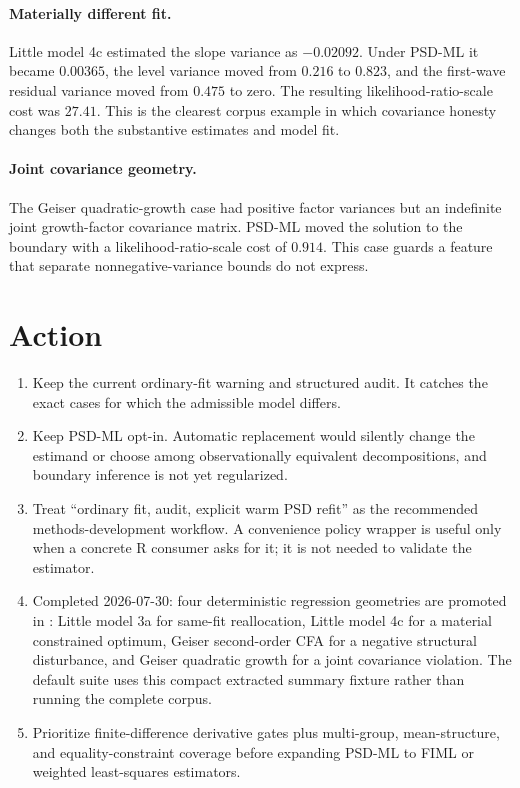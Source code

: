 \documentclass[11pt]{article}
\begin{document}
\paragraph{Materially different fit.}
Little model 4c estimated the slope variance as \(-0.02092\).  Under PSD-ML it
became \(0.00365\), the level variance moved from \(0.216\) to \(0.823\), and
the first-wave residual variance moved from \(0.475\) to zero.  The resulting
likelihood-ratio-scale cost was \(27.41\).  This is the clearest corpus example
in which covariance honesty changes both the substantive estimates and model
fit.

\paragraph{Joint covariance geometry.}
The Geiser quadratic-growth case had positive factor variances but an
indefinite joint growth-factor covariance matrix.  PSD-ML moved the solution
to the boundary with a likelihood-ratio-scale cost of \(0.914\).  This case
guards a feature that separate nonnegative-variance bounds do not express.

\section*{Action}

\begin{enumerate}
\item Keep the current ordinary-fit warning and structured audit.  It catches
the exact cases for which the admissible model differs.
\item Keep PSD-ML opt-in.  Automatic replacement would silently change the
estimand or choose among observationally equivalent decompositions, and
boundary inference is not yet regularized.
\item Treat ``ordinary fit, audit, explicit warm PSD refit'' as the recommended
methods-development workflow.  A convenience policy wrapper is useful only
when a concrete R consumer asks for it; it is not needed to validate the
estimator.
\item Completed 2026-07-30: four deterministic regression geometries are
promoted in : Little
model 3a for same-fit reallocation, Little model 4c for a material constrained
optimum, Geiser second-order CFA for a negative structural disturbance, and
Geiser quadratic growth for a joint covariance violation.  The default suite
uses this compact extracted summary fixture rather than running the complete
corpus.
\item Prioritize finite-difference derivative gates plus multi-group,
mean-structure, and equality-constraint coverage before expanding PSD-ML to
FIML or weighted least-squares estimators.
\end{enumerate}
\end{document}
